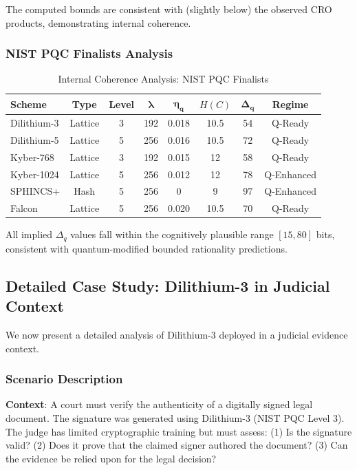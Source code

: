 \documentclass{ieeeaccess}
\begin{document}
The computed bounds are consistent with (slightly below) the observed CRO products, demonstrating internal coherence.

\subsubsection{NIST PQC Finalists Analysis}

\begin{table}[h]
\centering
\caption{Internal Coherence Analysis: NIST PQC Finalists}
\label{tab:pqc_coherence}
\small
\setlength{\tabcolsep}{3pt}
\begin{tabular}{lccccccc}
\toprule
\textbf{Scheme} & \textbf{Type} & \textbf{Level} & $\boldsymbol{\lambda}$ & $\boldsymbol{\eta_q}$ & $H(C)$ & $\boldsymbol{\Delta_q}$ & \textbf{Regime} \\
\midrule
Dilithium-3 & Lattice & 3 & 192 & 0.018 & 10.5 & 54 & Q-Ready \\
Dilithium-5 & Lattice & 5 & 256 & 0.016 & 10.5 & 72 & Q-Ready \\
Kyber-768 & Lattice & 3 & 192 & 0.015 & 12 & 58 & Q-Ready \\
Kyber-1024 & Lattice & 5 & 256 & 0.012 & 12 & 78 & Q-Enhanced \\
SPHINCS+ & Hash & 5 & 256 & 0 & 9 & 97 & Q-Enhanced \\
Falcon & Lattice & 5 & 256 & 0.020 & 10.5 & 70 & Q-Ready \\
\bottomrule
\end{tabular}
\end{table}

All implied $\Delta_q$ values fall within the cognitively plausible range $[15, 80]$ bits, consistent with quantum-modified bounded rationality predictions.

\subsection{Detailed Case Study: Dilithium-3 in Judicial Context}

We now present a detailed analysis of Dilithium-3 deployed in a judicial evidence context.

\subsubsection{Scenario Description}

\textbf{Context}: A court must verify the authenticity of a digitally signed legal document. The signature was generated using Dilithium-3 (NIST PQC Level 3). The judge has limited cryptographic training but must assess: (1) Is the signature valid? (2) Does it prove that the claimed signer authored the document? (3) Can the evidence be relied upon for the legal decision?
\end{document}
